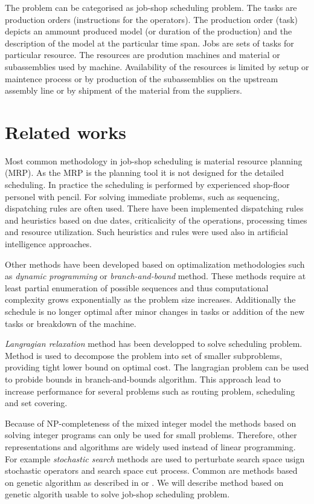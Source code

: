 \documentclass[a4paper,journal,twocolumn]{IEEEtran}
\begin{document}
The problem can be categorised as job-shop scheduling problem. The tasks are production orders (instructions for the operators).
The production order (task) depicts an ammount produced model (or duration of the production) and the description of the model
at the particular time span.
Jobs are sets of tasks for particular resource.
The resources are prodution machines and material or subassemblies used by machine.
Availability of the resources is limited by setup or maintence process or by production of the subassemblies
on the upstream assembly line or by shipment of the material from the suppliers.

\section{Related works}
Most common methodology in job-shop scheduling is material resource planning (MRP). As the MRP is the planning tool it
is not designed for the detailed scheduling. In practice the scheduling is performed by experienced shop-floor
personel with pencil. 
For solving immediate problems, such as sequencing, dispatching rules are often used. 
There have been implemented dispatching rules and heuristics  based on  due dates, criticalicity of the operations, 
processing times and resource utilization. 
Such heuristics and rules were used also in artificial intelligence approaches.\cite{Hoi}

Other methods have been developed based on optimalization methodologies such as \emph{dynamic programming} or 
\emph{branch-and-bound} method.
These methods require at least partial enumeration of possible sequences and thus computational complexity grows exponentially
as the problem size increases. Additionally the schedule is no longer optimal after minor changes in tasks or addition of the 
new tasks or breakdown of the machine.\cite{Hoi}

\emph{Langragian relaxation} method has been developped to solve scheduling problem. 
Method is used to decompose the problem into set of smaller subproblems, 
providing tight lower bound on optimal cost.\cite{Hoi}
The langragian problem can be used to probide bounds in branch-and-bounds algorithm.
This approach lead to increase performance for several problems such as routing problem, scheduling and set covering.\cite{Fis}

Because of NP-completeness of the mixed integer model the methods based on solving integer programs can only be used for 
small problems. Therefore, other representations and algorithms are widely used instead of linear programming. For example
\emph{stochastic search} methods are used to perturbate search space usign stochastic operators and search space cut process.
Common are methods based on genetic algorithm as described in \cite{Sed} or \cite{Uni}. We will describe method based 
on genetic algorith usable to solve job-shop scheduling problem.
\end{document}

